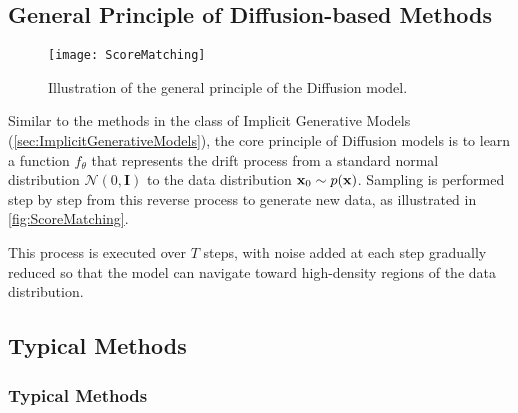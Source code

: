 \subsection{General Principle of Diffusion-based Methods}

\begin{figure}[h]
	\centering
	\texttt{[image: ScoreMatching]}
	\caption{Illustration of the general principle of the Diffusion model.}
	\label{fig:ScoreMatching}
\end{figure}

Similar to the methods in the class of Implicit Generative Models (\autoref{sec:ImplicitGenerativeModels}), the core principle of Diffusion models is to learn a function $f_{\theta}$ that represents the drift process from a standard normal distribution $\mathcal{N}(0, \mathbf{I})$ to the data distribution $\mathbf{x}_{0} \sim p(\mathbf{x})$. Sampling is performed step by step from this reverse process to generate new data, as illustrated in \autoref{fig:ScoreMatching}.

This process is executed over $T$ steps, with noise added at each step gradually reduced so that the model can navigate toward high-density regions of the data distribution.

\subsection{Typical Methods}
\label{subsec:TypicalMethod}


\subsubsection{Typical Methods}


